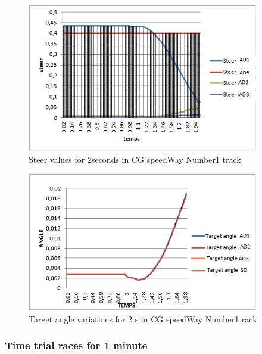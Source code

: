 \documentclass{llncs}
\begin{document}
\begin{figure}[h!]
	
	\centering
	\includegraphics[width=0.9\textwidth]{fig/steertest.PNG}
	\begin{minipage}{10cm}
		\centering
		\caption{\footnotesize  Steer values for 2seconds in CG speedWay Number1 track}
		\label{steertst}
	\end{minipage} 
	
\end{figure}	

\begin{figure}[h!]	
	\centering
	\includegraphics[width=0.9\textwidth]{fig/angletest.PNG}
	\begin{minipage}{10cm}
		\centering
		\caption{\footnotesize   Target angle variations for 2 s in CG speedWay Number1 rack }
		\label{steertst2}
	\end{minipage} 
	
\end{figure}
\subsubsection{Time trial races for 1 minute}
\end{document}
